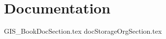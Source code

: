 
\chapter{Documentation}
{GIS_BookDocSection.tex}
\clearpage %
{docStorageOrgSection.tex}
\clearpage

